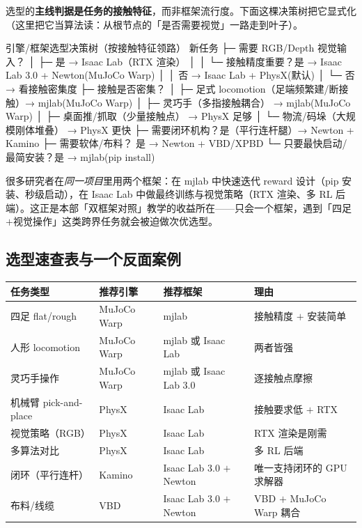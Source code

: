 选型的\textbf{主线判据是任务的接触特征}，而非框架流行度。下面这棵决策树把它显式化（这里把它当算法读：从根节点的「是否需要视觉」一路走到叶子）。

\begin{codebox}[text]{引擎/框架选型决策树（按接触特征领路）}
新任务
 ├─ 需要 RGB/Depth 视觉输入？
 │    ├─ 是 → Isaac Lab（RTX 渲染）
 │    │        └─ 接触精度重要？是 → Isaac Lab 3.0 + Newton(MuJoCo Warp)
 │    │                          否 → Isaac Lab + PhysX(默认)
 │    └─ 否 → 看接触密集度
 ├─ 接触是否密集？
 │    ├─ 足式 locomotion（足端频繁建/断接触）→ mjlab(MuJoCo Warp)
 │    ├─ 灵巧手（多指接触耦合）             → mjlab(MuJoCo Warp)
 │    ├─ 桌面推/抓取（少量接触点）           → PhysX 足够
 │    └─ 物流/码垛（大规模刚体堆叠）          → PhysX 更快
 ├─ 需要闭环机构？是（平行连杆腿）→ Newton + Kamino
 ├─ 需要软体/布料？  是 → Newton + VBD/XPBD
 └─ 只要最快启动/最简安装？是 → mjlab(pip install)
\end{codebox}

\begin{insight}\label{ins:rlmc-phys-select}
很多研究者在\emph{同一项目}里用两个框架：在 mjlab 中快速迭代 reward 设计（pip 安装、秒级启动），在 Isaac Lab 中做最终训练与视觉策略（RTX 渲染、多 RL 后端）。这正是本部「双框架对照」教学的收益所在——只会一个框架，遇到「四足$+$视觉操作」这类跨界任务就会被迫做次优选型。
\end{insight}

\subsection{选型速查表与一个反面案例}

\begin{center}
\small
\begin{tabular}{@{}llll@{}}
\toprule
任务类型 & 推荐引擎 & 推荐框架 & 理由 \\
\midrule
四足 flat/rough & MuJoCo Warp & mjlab & 接触精度 $+$ 安装简单 \\
人形 locomotion & MuJoCo Warp & mjlab 或 Isaac Lab & 两者皆强 \\
灵巧手操作 & MuJoCo Warp & mjlab 或 Isaac Lab 3.0 & 逐接触点摩擦 \\
机械臂 pick-and-place & PhysX & Isaac Lab & 接触要求低 $+$ RTX \\
视觉策略（RGB） & PhysX & Isaac Lab & RTX 渲染是刚需 \\
多算法对比 & PhysX & Isaac Lab & 多 RL 后端 \\
闭环（平行连杆） & Kamino & Isaac Lab 3.0 $+$ Newton & 唯一支持闭环的 GPU 求解器 \\
布料/线缆 & VBD & Isaac Lab 3.0 $+$ Newton & VBD $+$ MuJoCo Warp 耦合 \\
\bottomrule
\end{tabular}
\end{center}

